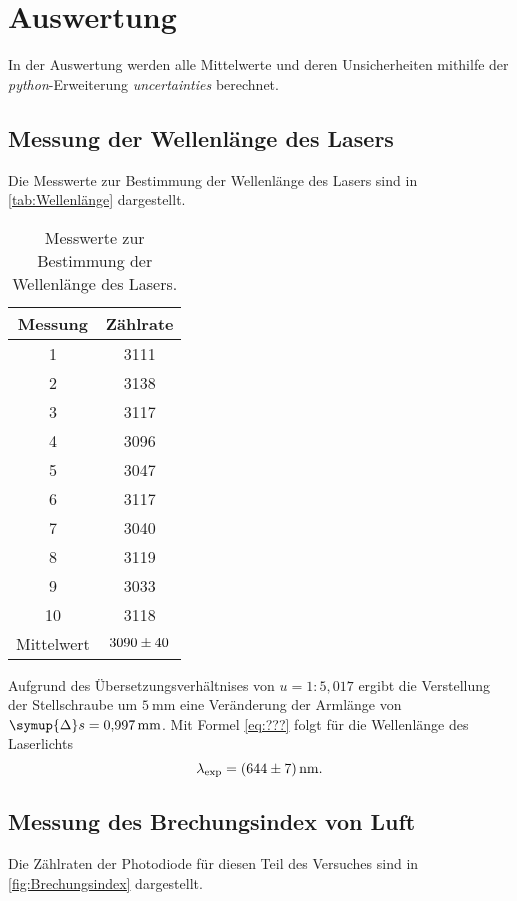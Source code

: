 \section{Auswertung}
\label{sec:Auswertung}
In der Auswertung werden alle Mittelwerte und deren Unsicherheiten mithilfe der \textit{python}-Erweiterung 
\textit{uncertainties} \cite{uncertainties} berechnet.

\subsection{Messung der Wellenlänge des Lasers}
Die Messwerte zur Bestimmung der Wellenlänge des Lasers sind in \autoref{tab:Wellenlänge} dargestellt.
\begin{table} [H]
    \centering
    \caption{Messwerte zur Bestimmung der Wellenlänge des Lasers.}
    \label{tab:Wellenlänge}
    \begin{tabular}{S S}
      \toprule
      {Messung} & {Zählrate} \\
        & 3111 \\
      2  & 3138 \\
      3  & 3117 \\
      4  & 3096 \\
      5  & 3047 \\
      6  & 3117 \\
      7  & 3040 \\
      8  & 3119 \\
      9  & 3033 \\
      10 & 3118 \\
      \midrule
      {Mittelwert} & $\num{3090+-40}$ \\  
      \bottomrule
    \end{tabular}
\end{table}

Aufgrund des Übersetzungsverhältnises von $u = 1:5,017$ ergibt die Verstellung der Stellschraube um $\qty{5}{\milli\metre}$
eine Veränderung der Armlänge von $\symup{\Delta}s=\qty{0.997}{\milli\metre}$. Mit Formel \eqref{eq:???} folgt für die 
Wellenlänge des Laserlichts
\begin{equation*}
    \lambda_{\text{exp}} = \qty{644+-7}{\nano\metre}.
\end{equation*}

\subsection{Messung des Brechungsindex von Luft}
Die Zählraten der Photodiode für diesen Teil des Versuches sind in \autoref{fig:Brechungsindex} dargestellt.
 

